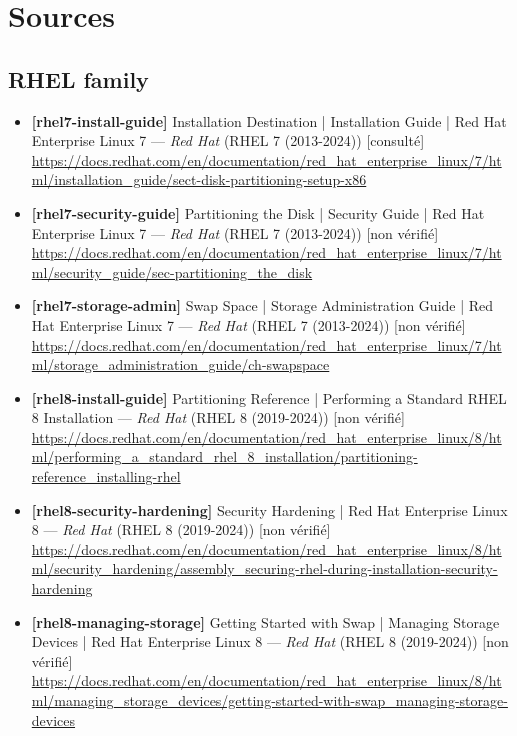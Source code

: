 \documentclass[10pt,a4paper]{article}
\begin{document}
\section{Sources}
\subsection{RHEL family}
\begin{itemize}[leftmargin=1.6em]
\item \textbf{[rhel7-install-guide]} Installation Destination | Installation Guide | Red Hat Enterprise Linux 7 --- \textit{Red Hat} (RHEL 7 (2013-2024)) \textcolor{cOk}{[consult\'e]}\\ \url{https://docs.redhat.com/en/documentation/red_hat_enterprise_linux/7/html/installation_guide/sect-disk-partitioning-setup-x86}
\item \textbf{[rhel7-security-guide]} Partitioning the Disk | Security Guide | Red Hat Enterprise Linux 7 --- \textit{Red Hat} (RHEL 7 (2013-2024)) \textcolor{cMed}{[non v\'erifi\'e]}\\ \url{https://docs.redhat.com/en/documentation/red_hat_enterprise_linux/7/html/security_guide/sec-partitioning_the_disk}
\item \textbf{[rhel7-storage-admin]} Swap Space | Storage Administration Guide | Red Hat Enterprise Linux 7 --- \textit{Red Hat} (RHEL 7 (2013-2024)) \textcolor{cMed}{[non v\'erifi\'e]}\\ \url{https://docs.redhat.com/en/documentation/red_hat_enterprise_linux/7/html/storage_administration_guide/ch-swapspace}
\item \textbf{[rhel8-install-guide]} Partitioning Reference | Performing a Standard RHEL 8 Installation --- \textit{Red Hat} (RHEL 8 (2019-2024)) \textcolor{cMed}{[non v\'erifi\'e]}\\ \url{https://docs.redhat.com/en/documentation/red_hat_enterprise_linux/8/html/performing_a_standard_rhel_8_installation/partitioning-reference_installing-rhel}
\item \textbf{[rhel8-security-hardening]} Security Hardening | Red Hat Enterprise Linux 8 --- \textit{Red Hat} (RHEL 8 (2019-2024)) \textcolor{cMed}{[non v\'erifi\'e]}\\ \url{https://docs.redhat.com/en/documentation/red_hat_enterprise_linux/8/html/security_hardening/assembly_securing-rhel-during-installation-security-hardening}
\item \textbf{[rhel8-managing-storage]} Getting Started with Swap | Managing Storage Devices | Red Hat Enterprise Linux 8 --- \textit{Red Hat} (RHEL 8 (2019-2024)) \textcolor{cMed}{[non v\'erifi\'e]}\\ \url{https://docs.redhat.com/en/documentation/red_hat_enterprise_linux/8/html/managing_storage_devices/getting-started-with-swap_managing-storage-devices}

\end{itemize}
\end{document}
